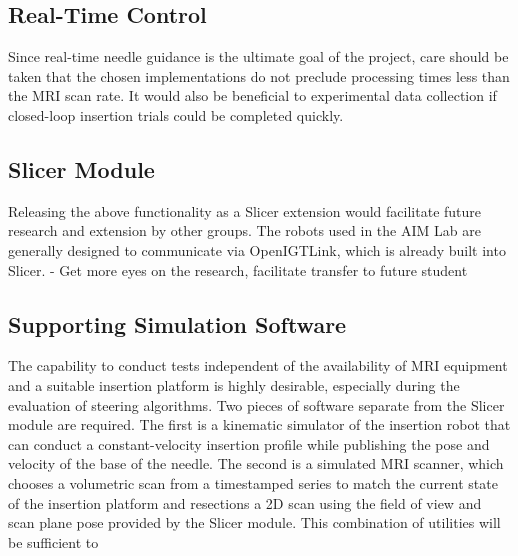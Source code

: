 \subsection{Real-Time Control}
Since real-time needle guidance is the ultimate goal of the project, care should be taken that the chosen implementations do not preclude processing times less than the MRI scan rate. It would also be beneficial to experimental data collection if closed-loop insertion trials could be completed quickly.

\subsection{Slicer Module}
Releasing the above functionality as a Slicer extension would facilitate future research and extension by other groups. The robots used in the AIM Lab are generally designed to communicate via OpenIGTLink, which is already built into Slicer.
- Get more eyes on the research, facilitate transfer to future student

\subsection{Supporting Simulation Software}
The capability to conduct tests independent of the availability of MRI equipment and a suitable insertion platform is highly desirable, especially during the evaluation of steering algorithms. Two pieces of software separate from the Slicer module are required. The first is a kinematic simulator of the insertion robot that can conduct a constant-velocity insertion profile while publishing the pose and velocity of the base of the needle. The second is a simulated MRI scanner, which chooses a volumetric scan from a timestamped series to match the current state of the insertion platform and resections a 2D scan using the field of view and scan plane pose provided by the Slicer module. This combination of utilities will be sufficient to 

